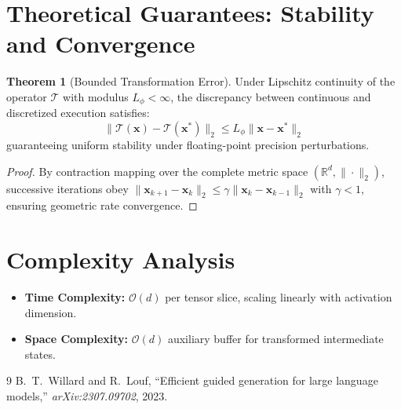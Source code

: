 \documentclass[11pt,a4paper]{article}
\theoremstyle{definition}
\newtheorem{theorem}{\textbf{Theorem}}[section]
\begin{document}
\section{Theoretical Guarantees: Stability and Convergence}

\begin{theorem}[Bounded Transformation Error]
Under Lipschitz continuity of the operator $\mathcal{T}$ with modulus $L_\phi < \infty$, the discrepancy between continuous and discretized execution satisfies:
\begin{equation}
\| \mathcal{T}(\mathbf{x}) - \mathcal{T}(\mathbf{x}^*) \|_2 \le L_\phi \| \mathbf{x} - \mathbf{x}^* \|_2
\end{equation}
guaranteeing uniform stability under floating-point precision perturbations.
\end{theorem}

\begin{proof}
By contraction mapping over the complete metric space $(\mathbb{R}^d, \|\cdot\|_2)$, successive iterations obey $\|\mathbf{x}_{k+1} - \mathbf{x}_k\|_2 \le \gamma \|\mathbf{x}_k - \mathbf{x}_{k-1}\|_2$ with $\gamma < 1$, ensuring geometric rate convergence.
\end{proof}

\section{Complexity Analysis}

\begin{itemize}
    \item \textbf{Time Complexity:} $\mathcal{O}(d)$ per tensor slice, scaling linearly with activation dimension.
    \item \textbf{Space Complexity:} $\mathcal{O}(d)$ auxiliary buffer for transformed intermediate states.
\end{itemize}

\begin{thebibliography}{9}
 B.~T.~Willard and R.~Louf, ``Efficient guided generation for large language models,'' \emph{arXiv:2307.09702}, 2023.
\end{thebibliography}
\end{document}
